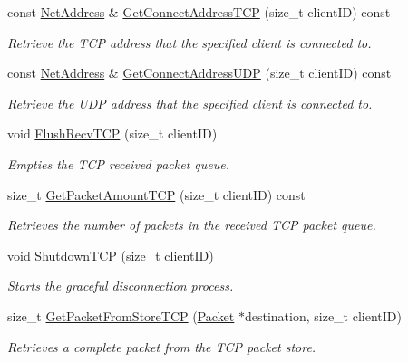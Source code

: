 \begin{DoxyCompactItemize}
const \hyperlink{class_net_address}{NetAddress} \& \hyperlink{class_net_instance_server_a3c59e50787e9899cbe28704311ab6c8d}{GetConnectAddressTCP} (size\_\-t clientID) const 
\begin{DoxyCompactList}\small\item\em Retrieve the TCP address that the specified client is connected to. \item\end{DoxyCompactList}\item 
const \hyperlink{class_net_address}{NetAddress} \& \hyperlink{class_net_instance_server_a3ffa00319b256d1b9e510a52b1a160f7}{GetConnectAddressUDP} (size\_\-t clientID) const 
\begin{DoxyCompactList}\small\item\em Retrieve the UDP address that the specified client is connected to. \item\end{DoxyCompactList}\item 
void \hyperlink{class_net_instance_server_a117f03d0c5b49d72eb9967a008e4d337}{FlushRecvTCP} (size\_\-t clientID)
\begin{DoxyCompactList}\small\item\em Empties the TCP received packet queue. \item\end{DoxyCompactList}\item 
size\_\-t \hyperlink{class_net_instance_server_ac15dcd9a67405e2a13caf4d22177044e}{GetPacketAmountTCP} (size\_\-t clientID) const 
\begin{DoxyCompactList}\small\item\em Retrieves the number of packets in the received TCP packet queue. \item\end{DoxyCompactList}\item 
void \hyperlink{class_net_instance_server_a6fc8b2758df2f359efbd6100e8f6fd24}{ShutdownTCP} (size\_\-t clientID)
\begin{DoxyCompactList}\small\item\em Starts the graceful disconnection process. \item\end{DoxyCompactList}\item 
size\_\-t \hyperlink{class_net_instance_server_a8b804b04c6ef8cd9dec91e715b55073d}{GetPacketFromStoreTCP} (\hyperlink{class_packet}{Packet} $\ast$destination, size\_\-t clientID)
\begin{DoxyCompactList}\small\item\em Retrieves a complete packet from the TCP packet store. \item\end{DoxyCompactList}\item 

\end{DoxyCompactItemize}
